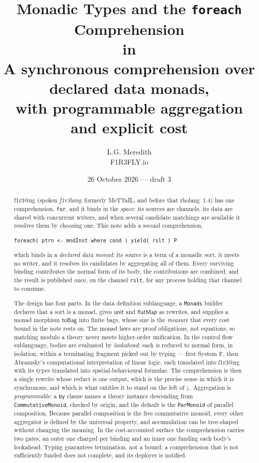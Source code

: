 \documentclass[11pt]{article}
\title{\bf Monadic Types and the \texttt{foreach} Comprehension\\ in \flangbf{}\\[2mm]
\large A synchronous comprehension over declared data monads,\\
\large with programmable aggregation and explicit cost}
\author{L.G. Meredith\\ \small F1R3FLY.io}
\date{26 October 2026 --- draft 3}
\makeatletter
\theoremstyle{definition}
\theoremstyle{plain}
\theoremstyle{remark}
\newcommand{\unit}{\mathsf{unit}}
\newcommand{\bind}{\mathsf{flatMap}}
\newcommand{\flang}{\textsf{f1r3\textbar @ng}}
\makeatother
\begin{document}
\maketitle

\begin{abstract}
\noindent
\flang{} (spoken \emph{f1r3lang}; formerly MeTTaIL, and before that rholang~1.4)
has one comprehension, \texttt{for}, and it binds in the \emph{space}: its
sources are channels, its data are shared with concurrent writers, and when
several candidate matchings are available it resolves them by choosing one.
This note adds a second comprehension,
\begin{center}
\texttt{foreach( ptrn <- mndInst where cond ) yield( rslt ) P}
\end{center}
which binds in a \emph{declared data monad}: its source is a term of a monadic
sort, it meets no writer, and it resolves its candidates by aggregating all of
them. Every surviving binding contributes the normal form of its body, the
contributions are combined, and the result is published once, on the channel
\texttt{rslt}, for any process holding that channel to consume.

The design has four parts. In the data definition sublanguage, a
\texttt{Monads} builder declares that a sort is a monad, gives \(\unit\) and
\(\bind\) as rewrites, and supplies a monad morphism \(\mathsf{toBag}\) into
finite bags, whose size is the \emph{measure} that every cost bound in the note
rests on. The monad laws are proof obligations, not equations, so matching
modulo a theory never meets higher-order unification. In the control flow
sublanguage, bodies are evaluated by \emph{lookahead}: each is reduced to normal
form, in isolation, within a terminating fragment picked out by typing --- first
System F, then Abramsky's computational interpretation of linear logic, each
translated into \flang{} with its types translated into spatial-behavioural
formulae. The
comprehension is then a single rewrite whose reduct is one output, which is
the precise sense in which it is synchronous, and which is what entitles it to
stand on the left of \texttt{;}. Aggregation is \emph{programmable}: a
\texttt{by} clause names a theory instance descending from
\texttt{CommutativeMonoid}, checked by origin, and the default is the
\texttt{ParMonoid} of parallel composition. Because parallel composition is the
free commutative monoid, every other aggregator is defined by the universal
property, and accumulation can be tree-shaped without changing the meaning.
In the cost-accounted surface the comprehension carries two gates, an outer
one charged per binding and an inner one funding each body's lookahead. Typing
guarantees termination, not a bound: a comprehension that is not sufficiently
funded does not complete, and its deployer is notified.


\end{abstract}
\end{document}
